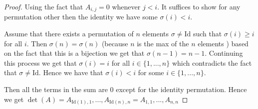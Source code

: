 \documentclass[letter,12pt]{article}
\begin{document}
\begin{proof}
    Using the fact that $A_{i,j}=0$ whenever $j<i$. It suffices to show for any permutation other then the identity we have some $\sigma(i)<i$. 

    Assume that there exists a permutation of $n$ elements $\sigma\not = \text{Id}$ such that $\sigma(i)\geq i$ for all $i$. Then $\sigma(n)=\sigma(n)$ (because $n$ is the max of the $n$ elements ) based on the fact that this is a bijection we get that $\sigma(n-1)=n-1$. Continuing this process we get that $\sigma(i)=i$ for all $i\in \{1,...,n\}$ which contradicts the fact that $\sigma\not = \text{Id}$. Hence we have that $\sigma(i)<i$ for some $i\in \{1,...,n\}$. 
    
    Then all the terms in the sum are $0$ except for the identity permutation. Hence we get $\det(A)=A_{\text{Id}(1),1},...,A_{\text{Id}(n),n}=A_{1,1},...,A_{n,n}$

\end{proof}
\end{document}
